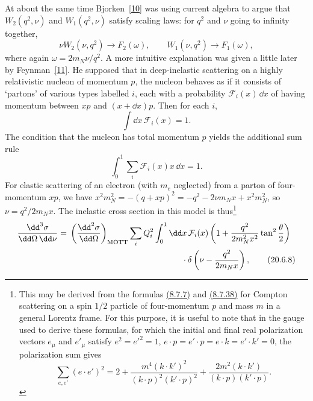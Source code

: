 At about the same time Bjorken~\hyperref[ch20-ref-10]{[10]} was using current algebra to argue that $W_2(q^2,\nu)$ and $W_1(q^2,\nu)$ satisfy scaling laws: for $q^2$ and $\nu$ going to infinity together,
\begin{equation}
\nu W_2(\nu,q^2)\longrightarrow F_2(\omega),
\qquad
W_1(\nu,q^2)\longrightarrow F_1(\omega),
\tag{20.6.5}\label{eq:20.6.5}
\end{equation}
where again $\omega=2m_N\nu/q^2$. A more intuitive explanation was given a little later by Feynman~\hyperref[ch20-ref-11]{[11]}. He supposed that in deep-inelastic scattering on a highly relativistic nucleon of momentum $p$, the nucleon behaves as if it consists of `partons' of various types labelled $i$, each with a probability $\mathcal F_i(x)\,\dd x$ of having momentum between $xp$ and $(x+\dd x)p$. Then for each $i$,
\begin{equation}
\int \dd x\,\mathcal F_i(x)=1.
\tag{20.6.6}\label{eq:20.6.6}
\end{equation}
The condition that the nucleon has total momentum $p$ yields the additional sum rule
\begin{equation}
\int_0^1\sum_i\mathcal F_i(x)x\,\dd x=1.
\tag{20.6.7}\label{eq:20.6.7}
\end{equation}
For elastic scattering of an electron (with $m_e$ neglected) from a parton of four-momentum $xp$, we have $x^2m_N^2=-(q+xp)^2=-q^2-2\nu m_Nx+x^2m_N^2$, so $\nu=q^2/2m_Nx$. The inelastic cross section in this model is thus\footnote{This may be derived from the formulas \hyperref[eq:8.7.7]{(8.7.7)} and \hyperref[eq:8.7.38]{(8.7.38)} for Compton scattering on a spin $1/2$ particle of four-momentum $p$ and mass $m$ in a general Lorentz frame. For this purpose, it is useful to note that in the gauge used to derive these formulas, for which the initial and final real polarization vectors $e_\mu$ and $e'_\mu$ satisfy $e^2=e'^2=1$, $e\cdot p=e'\cdot p=e\cdot k=e'\cdot k'=0$, the polarization sum gives
\[
\sum_{e,e'}(e\cdot e')^2
=2+\frac{m^4(k\cdot k')^2}{(k\cdot p)^2(k'\cdot p)^2}
+\frac{2m^2(k\cdot k')}{(k\cdot p)(k'\cdot p)}.
\]}
\begin{align}
\frac{\dd^3\sigma}{\dd\Omega\,\dd\nu}
={}&
\left(\frac{\dd^2\sigma}{\dd\Omega}\right)_{\mathrm{MOTT}}
\sum_iQ_i^2\int_0^1\dd x\,\mathcal F_i(x)
\left(1+\frac{q^2}{2m_N^2x^2}\tan^2\frac{\theta}{2}\right)
\notag\\
&\hspace{47mm}\cdot
\delta\left(\nu-\frac{q^2}{2m_Nx}\right),
\tag{20.6.8}\label{eq:20.6.8}
\end{align}
